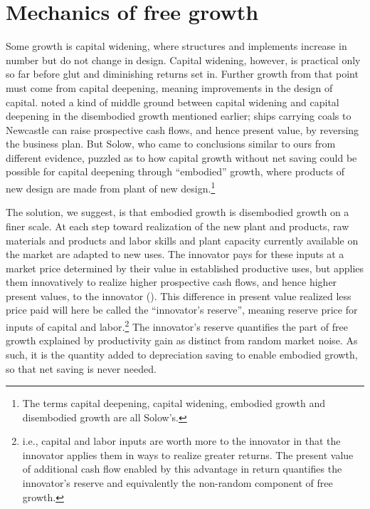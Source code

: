 \documentclass[a4paper,fleqn]{latex_styles/cas-sc}
\begin{document}
\hypertarget{mechanics-of-free-growth}{%
\section{Mechanics of free growth}\label{mechanics-of-free-growth}}

Some growth is capital widening, where structures and implements
increase in number but do not change in design. Capital widening,
however, is practical only so far before glut and diminishing returns
set in. Further growth from that point must come from capital deepening,
meaning improvements in the design of capital.
\citet{solowContributionTheoryEconomic1956a} noted a kind of middle
ground between capital widening and capital deepening in the disembodied
growth mentioned earlier; ships carrying coals to Newcastle can raise
prospective cash flows, and hence present value, by reversing the
business plan. But Solow, who came to conclusions similar to ours from
different evidence, puzzled as to how capital growth without net
saving could be possible for capital deepening through ``embodied''
growth, where products of new design are made from plant of new
design.\footnote{The terms capital deepening, capital widening, embodied
  growth and disembodied growth are all Solow's.}


The solution, we suggest, is that embodied growth is disembodied growth
on a finer scale. At each step toward realization of the new plant and
products, raw materials and products and labor skills and plant capacity
currently available on the market are adapted to new uses. The innovator
pays for these inputs at a market price determined by their value in
established productive uses, but applies them innovatively to realize
higher prospective cash flows, and hence higher present values, to the
innovator
(\citet{marshallPrinciplesEconomics1890, schumpeterTheoryEconomicDevelopment1934}).
This difference in present value realized less price paid will here be
called the ``innovator's reserve'', meaning reserve price for inputs of
capital and labor.\footnote{i.e., capital and labor inputs are worth
  more to the innovator in that the innovator applies them in ways to
  realize greater returns. The present value of additional cash flow
  enabled by this advantage in return quantifies the innovator's reserve
  and equivalently the non-random component of free growth.} The innovator's reserve quantifies the
part of free growth explained by productivity gain as distinct from
random market noise. As such, it is the quantity added to depreciation
saving to enable embodied growth, so that net saving is never
needed.
\end{document}
